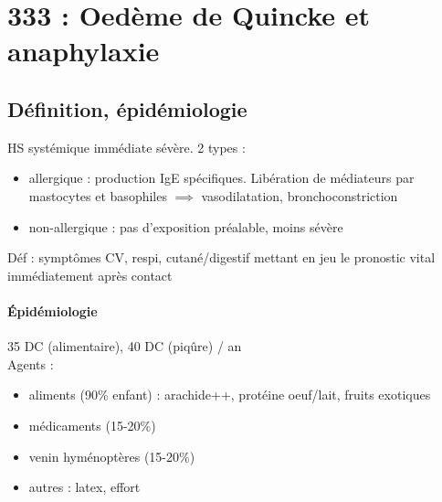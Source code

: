 \documentclass{article}
\begin{document}
\section{333 : Oedème de Quincke et anaphylaxie}%
\label{sec:333_oedeme_de_quincke_et_anaphylaxie}

\subsection{Définition, épidémiologie}
HS systémique immédiate sévère. 2 types :
\begin{itemize}
\item allergique : production IgE spécifiques. Libération de médiateurs par
  mastocytes et basophiles $\implies$ vasodilatation, bronchoconstriction
\item non-allergique : pas d'exposition préalable, moins sévère 
\end{itemize}
Déf : symptômes CV, respi, cutané/digestif mettant en
jeu le pronostic vital immédiatement après contact

\paragraph{Épidémiologie}
35 DC (alimentaire), 40 DC (piqûre) / an\\
Agents :
\begin{itemize}
\item aliments (90\% enfant) : arachide++, protéine oeuf/lait, fruits exotiques
\item médicaments (15-20\%)
\item venin hyménoptères (15-20\%)
\item autres : latex, effort
\end{itemize}
\end{document}
